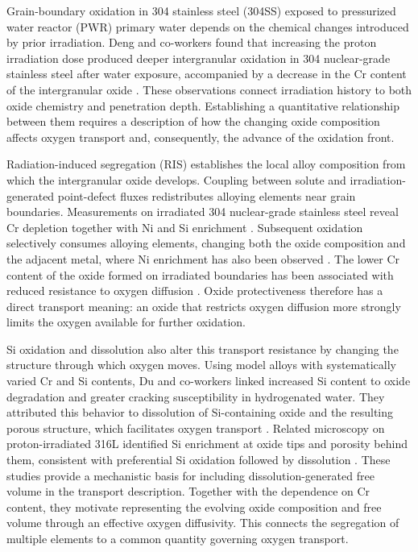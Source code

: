 
Grain-boundary oxidation in 304 stainless steel (304SS) exposed to
pressurized water reactor (PWR) primary water depends on the chemical
changes introduced by prior irradiation. Deng and co-workers found that
increasing the proton irradiation dose produced deeper intergranular
oxidation in 304 nuclear-grade stainless steel after water exposure,
accompanied by a decrease in the Cr content of the intergranular oxide
\parencite{deng2017}. These observations connect irradiation history to
both oxide chemistry and penetration depth. Establishing a quantitative
relationship between them requires a description of how the changing
oxide composition affects oxygen transport and, consequently, the
advance of the oxidation front.

Radiation-induced segregation (RIS) establishes the local alloy
composition from which the intergranular oxide develops. Coupling between
solute and irradiation-generated point-defect fluxes redistributes
alloying elements near grain boundaries. Measurements on irradiated
304 nuclear-grade stainless steel reveal Cr depletion together with Ni
and Si enrichment \parencite{deng2017,deng2021apt}. Subsequent oxidation
selectively consumes alloying elements, changing both the oxide composition
and the adjacent metal, where Ni enrichment has also been observed
\parencite{deng2021apt}. The lower Cr content of the oxide formed on
irradiated boundaries has been associated with reduced resistance to
oxygen diffusion \parencite{deng2017}. Oxide protectiveness therefore
has a direct transport meaning: an oxide that restricts oxygen diffusion
more strongly limits the oxygen available for further oxidation.

Si oxidation and dissolution also alter this transport resistance by
changing the structure through which oxygen moves. Using model alloys
with systematically varied Cr and Si contents, Du and co-workers linked
increased Si content to oxide degradation and greater cracking
susceptibility in hydrogenated water. They attributed this behavior to
dissolution of Si-containing oxide and the resulting porous structure,
which facilitates oxygen transport \parencite{du2026}. Related microscopy
on proton-irradiated 316L identified Si enrichment at oxide tips and
porosity behind them, consistent with preferential Si oxidation followed
by dissolution \parencite{kuang2022}. These studies provide a mechanistic
basis for including dissolution-generated free volume in the transport
description. Together with the dependence on Cr content, they motivate
representing the evolving oxide composition and free volume through an
effective oxygen diffusivity. This connects the segregation of multiple
elements to a common quantity governing oxygen transport.

